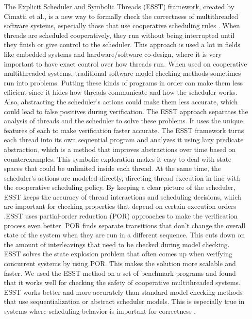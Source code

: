 \documentclass[conference]{IEEEtran}
\begin{document}
 The Explicit Scheduler and Symbolic Threads (ESST) framework, created by Cimatti et al., is a new way to formally check the correctness of multithreaded software systems, especially those that use cooperative scheduling rules \cite{cimatti2012software}.  When threads are scheduled cooperatively, they run without being interrupted until they finish or give control to the scheduler.  This approach is used a lot in fields like embedded systems and hardware/software co-design, where it is very important to have exact control over how threads run. When used on cooperative multithreaded systems, traditional software model checking methods sometimes run into problems.  Putting these kinds of programs in order can make them less efficient since it hides how threads communicate and how the scheduler works.  Also, abstracting the scheduler's actions could make them less accurate, which could lead to false positives during verification.  The ESST approach separates the analysis of threads and the scheduler to solve these problems. It uses the unique features of each to make verification faster accurate. The ESST framework turns each thread into its own sequential program and analyzes it using lazy predicate abstraction, which is a method that improves abstractions over time based on counterexamples.  This symbolic exploration makes it easy to deal with state spaces that could be unlimited inside each thread.  At the same time, the scheduler's actions are modeled directly, directing thread execution in line with the cooperative scheduling policy.  By keeping a clear picture of the scheduler, ESST keeps the accuracy of thread interactions and scheduling decisions, which are important for checking properties that depend on certain execution orders \cite{cimatti2012software}.ESST uses partial-order reduction (POR) approaches to make the verification process even better.  POR finds separate transitions that don't change the overall state of the system when they are run in a different sequence. This cuts down on the amount of interleavings that need to be checked during model checking.  ESST solves the state explosion problem that often comes up when verifying concurrent systems by using POR. This makes the solution more scalable and faster. We used the ESST method on a set of benchmark programs and found that it works well for checking the safety of cooperative multithreaded systems.  ESST works better and more accurately than standard model-checking methods that use sequentialization or abstract scheduler models. This is especially true in systems where scheduling behavior is important for correctness \cite{cimatti2012software}.
\end{document}

